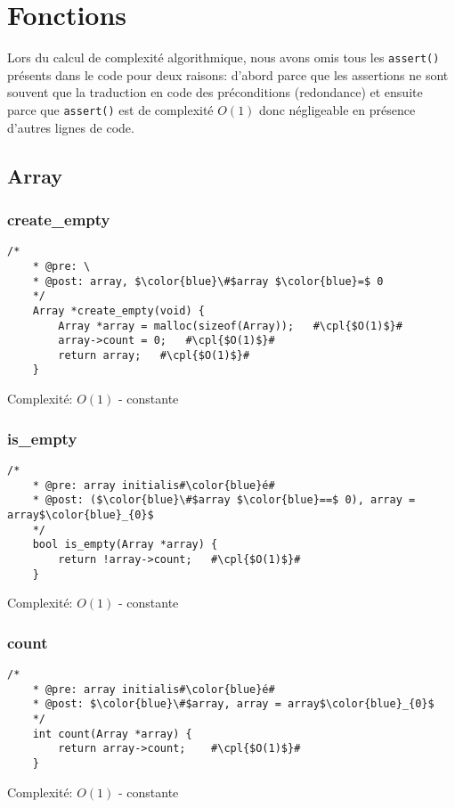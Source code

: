 \documentclass[a4paper, 11pt, oneside]{article}
\begin{document}
	\clearpage
\section {Fonctions}
	Lors du calcul de complexité algorithmique, nous avons omis tous les \texttt{assert()} présents dans le code pour deux raisons: d'abord parce que les assertions ne sont souvent que la traduction en code des préconditions (redondance) et ensuite parce que \texttt{assert()} est de complexité $O(1)$ donc négligeable en présence d'autres lignes de code.
	\subsection{Array}
	\subsubsection{create\_empty}
	\begin{lstlisting}[mathescape]
	/*
	* @pre: \
	* @post: array, $\color{blue}\#$array $\color{blue}=$ 0
	*/
	Array *create_empty(void) {
		Array *array = malloc(sizeof(Array));	#\cpl{$O(1)$}#
		array->count = 0;	#\cpl{$O(1)$}#
		return array;	#\cpl{$O(1)$}#
	}
	\end{lstlisting}
	Complexité: $O(1)$ - constante
	
	\subsubsection{is\_empty}
	\begin{lstlisting}[mathescape]
	/*
	* @pre: array initialis#\color{blue}é#
	* @post: ($\color{blue}\#$array $\color{blue}==$ 0), array = array$\color{blue}_{0}$
	*/
	bool is_empty(Array *array) {
		return !array->count;	#\cpl{$O(1)$}#
	}
	\end{lstlisting}
	Complexité: $O(1)$ - constante
	
	\subsubsection{count}
	\begin{lstlisting}[mathescape]
	/*
	* @pre: array initialis#\color{blue}é#
	* @post: $\color{blue}\#$array, array = array$\color{blue}_{0}$
	*/
	int count(Array *array) {
		return array->count;	#\cpl{$O(1)$}#
	}
	\end{lstlisting}
	Complexité: $O(1)$ - constante
	
	\clearpage
\end{document}
